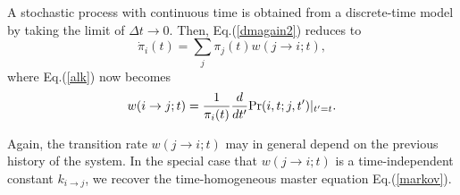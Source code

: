 \documentclass[aps,pre,amsmath,amssymb,floatfix,preprint,nofootinbib]{revtex4}
\begin{document}
A stochastic process with continuous time is obtained from a discrete-time model by taking the limit of $\Delta t \to 0$. Then, Eq.(\ref{dmagain2}) reduces to
\begin{equation}
\dot \pi_i (t) = \sum_j \pi_j(t) w(j \to i; t),
\end{equation}
where Eq.(\ref{alk}) now becomes
\begin{equation}
w(i \to j; t) = \frac{1}{\pi_i(t)}\frac{d}{dt'}{\rm Pr}(i,t;j,t')|_{t'=t}.
\end{equation}

Again, the transition rate $w(j \to i; t)$ may in general depend on the previous history of the system. In the special case that $w(j \to i; t)$ is a time-independent constant $k_{i \to j}$, we recover the time-homogeneous master equation Eq.(\ref{markov}).
\end{document}
